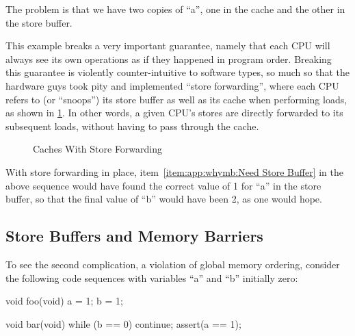 The problem is that we have two copies of ``a'', one in the cache and
the other in the store buffer.

This example breaks a very important guarantee, namely that each CPU
will always see its own operations as if they happened in program order.
Breaking this guarantee is violently counter-intuitive to software types,
so much so
that the hardware guys took pity and implemented ``store forwarding'',
where each CPU refers to (or ``snoops'') its store buffer as well
as its cache when performing loads, as shown in
\cref{fig:app:whymb:Caches With Store Forwarding}.
In other words, a given CPU's stores are directly forwarded to its
subsequent loads, without having to pass through the cache.

\begin{figure}
\centering
{}
\caption{Caches With Store Forwarding}
\label{fig:app:whymb:Caches With Store Forwarding}
\end{figure}

With store forwarding in place, item~\ref{item:app:whymb:Need Store Buffer}
in the above sequence would have found the correct value of 1 for ``a'' in
the store buffer, so that the final value of ``b'' would have been 2,
as one would hope.

\subsection{Store Buffers and Memory Barriers}
\label{sec:app:whymb:Store Buffers and Memory Barriers}

To see the second complication, a violation of global memory ordering,
consider the following code sequences
with variables ``a'' and ``b'' initially zero:

\begin{VerbatimN}[fontsize=\footnotesize,samepage=true]
void foo(void)
{
	a = 1;
	b = 1;
}

void bar(void)
{
	while (b == 0) continue;
	assert(a == 1);
}
\end{VerbatimN}

